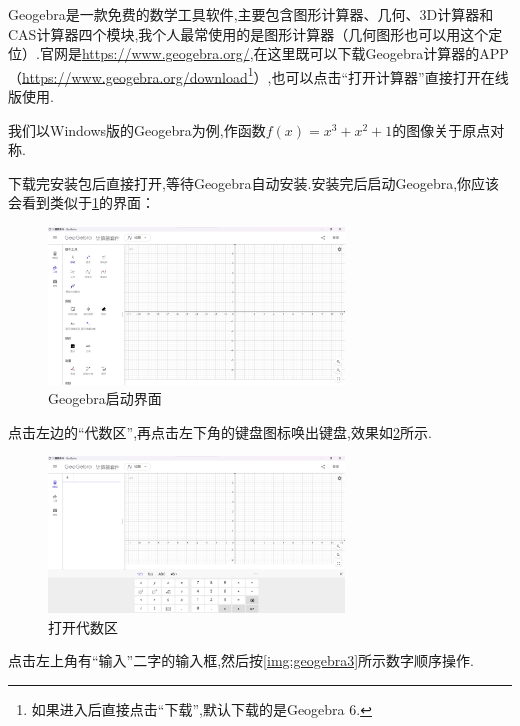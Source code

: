 \documentclass[lang=cn,math=cm,chinesefont=nofont,11pt,scheme=chinese,twocol]{elegantbook}
\begin{document}
Geogebra是一款免费的数学工具软件,主要包含图形计算器、几何、3D计算器和CAS计算器四个模块,我个人最常使用的是图形计算器（几何图形也可以用这个定位）.官网是\href{https://www.geogebra.org/}{https://www.geogebra.org/},在这里既可以下载Geogebra计算器的APP（\href{https://www.geogebra.org/download}{https://www.geogebra.org/download}\footnote{如果进入后直接点击“下载”,默认下载的是Geogebra 6.}）,也可以点击“打开计算器”直接打开在线版使用.

我们以Windows版的Geogebra为例,作函数$f(x)=x^3+x^2+1$的图像关于原点对称.

下载完安装包后直接打开,等待Geogebra自动安装.安装完后启动Geogebra,你应该会看到类似于\ref{img:geogebra1}的界面：

\begin{figure}[h]
  \centering
  \includegraphics[width=0.7\textwidth]{image/geogebra1.png}
  \caption{Geogebra启动界面}
  \label{img:geogebra1}
\end{figure}



\hspace*{\fill}

点击左边的“代数区”,再点击左下角的键盘图标唤出键盘,效果如\ref{img:geogebra2}所示.

\begin{figure}[h]
  \centering
  \includegraphics[width=0.7\textwidth]{image/geogebra2.png}
  \caption{打开代数区}
  \label{img:geogebra2}
\end{figure}

点击左上角有“输入”二字的输入框,然后按\ref{img:geogebra3}所示数字顺序操作.
\end{document}
